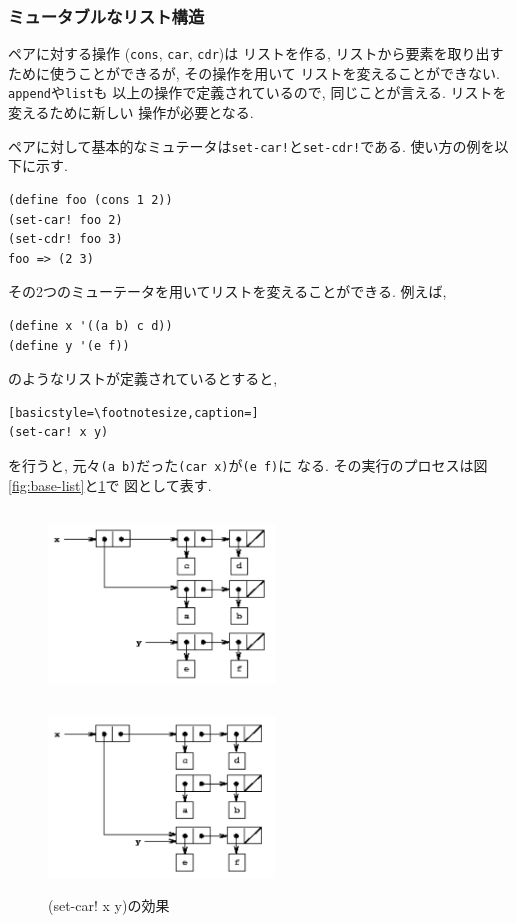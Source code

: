 \subsubsection{ミュータブルなリスト構造}
ペアに対する操作 (\lstinline{cons}, \lstinline{car}, \lstinline{cdr})は
リストを作る, リストから要素を取り出すために使うことができるが, その操作を用いて
リストを変えることができない. \lstinline{append}や\lstinline{list}も
以上の操作で定義されているので, 同じことが言える. リストを変えるために新しい
操作が必要となる.

ペアに対して基本的なミュテータは\lstinline{set-car!}と\lstinline{set-cdr!}である.
使い方の例を以下に示す.

\begin{lstlisting}[basicstyle=\footnotesize]
(define foo (cons 1 2))
(set-car! foo 2)
(set-cdr! foo 3)
foo => (2 3)
\end{lstlisting}

その2つのミューテータを用いてリストを変えることができる. 例えば,
\begin{lstlisting}[basicstyle=\footnotesize]
(define x '((a b) c d))
(define y '(e f))
\end{lstlisting}
のようなリストが定義されているとすると,
\begin{lstlisting}[basicstyle=\footnotesize,caption=]
(set-car! x y)
\end{lstlisting}
を行うと, 元々\lstinline{(a b)}だった\lstinline{(car x)}が\lstinline{(e f)}に
なる.
その実行のプロセスは図\ref{fig:base-list}と\ref{fig:changed-list}で
図として表す.

\begin{figure}[t]
  \begin{minipage}{0.48\linewidth}
    \centering
    \includegraphics[height=5cm,width=6cm]{imgs/base_list.png}
    \caption{\label{fig:base-list}x: ((a b) c d), y: (e f)}
  \end{minipage}
  \begin{minipage}{0.48\linewidth}
    \centering
    \includegraphics[height=5cm,width=6cm]{imgs/changed_list.png}
    \caption{\label{fig:changed-list}(set-car! x y)の効果}
  \end{minipage}
\end{figure}

